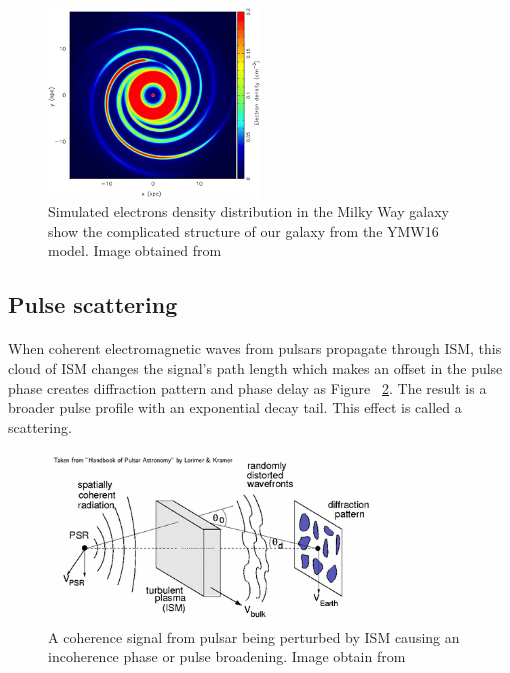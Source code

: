 \documentclass[thesis_msc.tex]{subfiles}
\begin{document}
\begin{figure}[h]
\centering
\includegraphics[width=0.5\textwidth]{figures/nedist.jpg}
\caption{Simulated electrons density distribution in the Milky Way galaxy show the complicated structure of our galaxy from the YMW16 model. Image obtained from \citep{yao2017new}  }
\label{nedist}
\end{figure}

    
    \subsection{Pulse scattering}
\paragraph{} When coherent electromagnetic waves from pulsars propagate through ISM, this cloud of ISM changes the signal's path length which makes an offset in the pulse phase creates diffraction pattern and phase delay as Figure ~\ref{scatt}. The result is a broader pulse profile with an exponential decay tail. This effect is called a scattering. 

 \begin{figure}[h] \centering 
\includegraphics[width=0.8\textwidth]{figures/scatt.png}
\caption{A coherence signal from pulsar being perturbed by ISM causing an incoherence phase or pulse broadening. Image obtain from \citep{handbook}  }

\label{scatt}
\end{figure}
\end{document}
